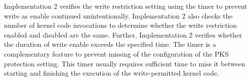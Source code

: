 
%
Implementation 2 verifies the write restriction setting using the timer to
prevent write as enable continued unintentionally.
%
Implementation 2 also checks the number of kernel code invocations to determine whether the
write restriction enabled and disabled are the same.
%
Further, Implementation 2 verifies whether the duration of write enable exceeds
the specified time.
%
The timer is a complementary feature to prevent missing of the configuration of
  the PKS protection setting. 
%
This timer usually requires sufficient time to miss it between starting and
finishing the execution of the write-permitted kernel code.




  
  
    
